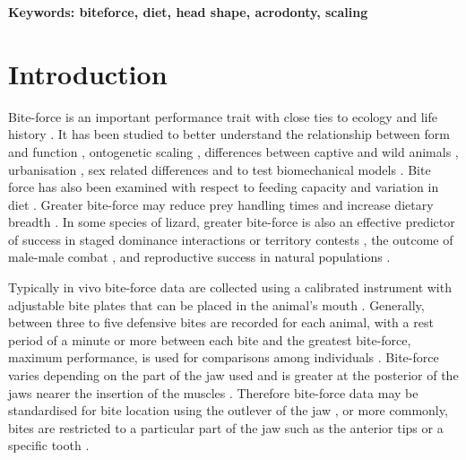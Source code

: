 \documentclass[a4paper, 12pt]{article}
\begin{document}
\textbf{Keywords: biteforce, diet, head shape, acrodonty, scaling}


\section{Introduction}\label{main}
Bite-force is an important performance trait with close ties to ecology and life history \citep{herrel1999morphology,anderson2008bite,erickson2014comparative,lappin2014reliable,husak2009fitness}. 
It has been studied to better understand the relationship between form and function \citep{erickson2014comparative,schaerlaeken2012built}, ontogenetic scaling \citep{erickson2003ontogeny,herrel2006ecological,becerra2011bite,marshall2012ontogenetic,jones2009bite,lappin2017bite}, differences between captive and wild animals \citep{erickson2004comparison}, urbanisation \citep[e.g.][]{baxter2019street}, sex related differences \citep{herrel1999sexual,lappin2006biteB,jones2020reproductive, lappin2006gapingA} and to test biomechanical models \citep[e.g.][]{groning2013importance,montuelle2015vivo,sellers2017ontogeny}.
Bite force has also been examined with respect to feeding capacity and variation in diet \citep{huber2005analysis,santana2010mechanics,marshall2012ontogenetic,erickson2003ontogeny}.
Greater bite-force may reduce prey handling times and increase dietary breadth \citep{herrel1999morphology,herrel2004omnivory,verwaijen2002relationships,van2006seed,broeckhoven2014under,taverne2020proximate}. 
In some species of lizard, greater bite-force is also an effective predictor of success in staged dominance interactions or territory contests \citep{lailvaux2004performance,lappin2005weapon}, the outcome of male-male combat \citep{husak2006bite,huyghe2005morphology,lailvaux2004performance}, and reproductive success in natural populations \citep{husak2006bite,husak2009fitness,lappin2005weapon}.

Typically in vivo bite-force data are collected using a calibrated instrument with adjustable bite plates that can be placed in the animal's mouth \citep[e.g.][]{herrel1999sexual,anderson2008bite}. 
Generally, between three to five defensive bites are recorded for each animal, with a rest period of a minute or more between each bite \citep[e.g.][]{herrel1999morphology,lappin2006biteB} and the greatest bite-force, maximum performance, is used for comparisons among individuals \citep{hertz1988time}. 
Bite-force varies depending on the part of the jaw used and is greater at the posterior of the jaws nearer the insertion of the muscles \citep[e.g.][]{groning2013importance}. 
Therefore bite-force data may be standardised for bite location using the outlever of the jaw \citep{lappin2014reliable}, or more commonly, bites are restricted to a particular part of the jaw such as the anterior tips \citep[e.g.][]{herrel1999morphology} or a specific tooth \citep[e.g.][]{erickson2003ontogeny}. 
\end{document}

